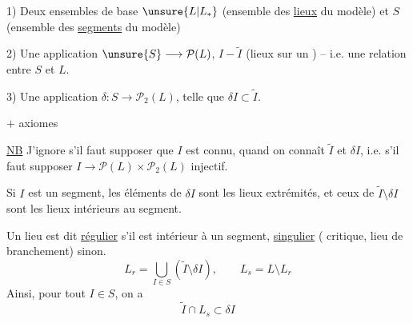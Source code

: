 
1) Deux ensembles de base $\unsure{L|L_*}$ (ensemble des \uline{lieux} du modèle) et $S$ (ensemble des \uline{segments} du modèle)

2) Une application $\unsure{S}\longrightarrow\mathcal P(L)$, $I-\tilde I$ (lieux sur un ) -- i.e. une relation entre $S$ et $L$.

3) Une application $\delta:S\longrightarrow\mathcal P_2(L)$,  telle que $\delta I\subset\tilde I$.

 $+$ axiomes

\uline{NB} J'ignore s'il faut supposer que $I$ est connu, quand on connaît $\tilde I$ et $\delta I$, i.e. s'il faut supposer $I\longrightarrow\mathcal P(L)\times\mathcal P_2(L)$ injectif.


Si $I$ est un segment, les éléments de $\delta I$ sont les lieux extrémités, et ceux de $\tilde I\setminus\delta I$  sont les lieux intérieurs au segment.

Un lieu est dit \uline{régulier} s'il est intérieur à  un segment, \uline{singulier} ( critique, lieu de branchement) sinon.
\[
L_r=\bigcup_{I\in S}(\tilde I\setminus\delta I),\qquad L_s=L\setminus L_r
\]
Ainsi, pour tout $I\in S$, on a
\[
\tilde I\cap L_s\subset\delta I
\]

